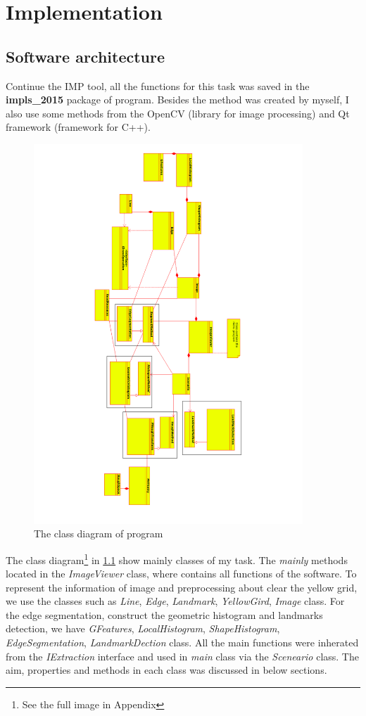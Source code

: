 \chapter{Implementation}
\section{Software architecture}
Continue the IMP tool, all the functions for this task was saved in the \textbf{impls\_2015} package of program. Besides the method was created by myself, I also use some methods from the OpenCV (library for image processing) and Qt framework (framework for C++).\\[0.2cm]
\begin{figure}[h!]
\centering
\includegraphics[width=0.9\textwidth]{images/cdiagram}
\caption{The class diagram of program}
\label{fig:cdiagram}
\end{figure}
The class diagram\footnote{See the full image in Appendix} in \ref{fig:cdiagram} show mainly classes of my task. The \textit{mainly} methods located in the \textit{ImageViewer} class, where contains all functions of the software. To represent the information of image and preprocessing about clear the yellow grid, we use the classes such as \textit{Line}, \textit{Edge}, \textit{Landmark}, \textit{YellowGird}, \textit{Image} class. For the edge segmentation, construct the geometric histogram and landmarks detection, we have \textit{GFeatures}, \textit{LocalHistogram}, \textit{ShapeHistogram}, \textit{EdgeSegmentation}, \textit{LandmarkDection} class. All the main functions were inherated from the \textit{IExtraction} interface and used in \textit{main} class via the \textit{Sceneario} class. The aim, properties and methods in each class was discussed in below sections.
